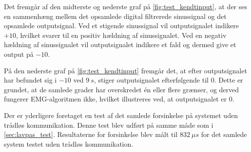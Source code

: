Det fremgår af den midterste og nederste graf på \autoref{fig:test_kendtinput}, at der ses en sammenhæng mellem det opsamlede digital filtrerede sinussignal og det opsamlede outputsignal. Ved et stigende sinussignal vil outputsignalet indikere $+10$, hvilket svarer til en positiv hældning af sinussignalet. Ved en negativ hældning af sinussignalet vil outputsignalet indikere et fald og dermed give et output på $-10$.

På den nederste graf på \autoref{fig:test_kendtinput} fremgår det, at efter outputsignalet har befundet sig i $-10$ ved $9~s$, stiger outputsignalet efterfølgende til $0$. Dette er grundet, at de samlede grader har overskredet én eller flere grænser, og derved fungerer EMG-algoritmen ikke, hvilket illustreres ved, at outputsignalet er $0$.

Der er yderligere foretaget en test af det samlede forsinkelse på systemet uden trådløs kommunikation. Denne test blev udført på samme måde som i \autoref{sec:lavpas_test}. Resultaterne for forsinkelse blev målt til $832~\mu s$ for det samlede system testet uden trådløs kommunikation. 